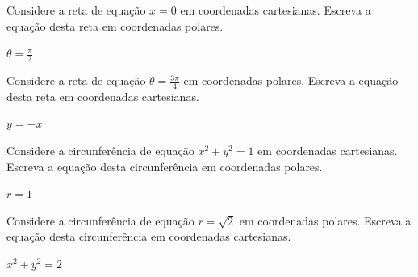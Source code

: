 \begin{exer}
  Considere a reta de equação $x = 0$ em coordenadas cartesianas. Escreva a equação desta reta em coordenadas polares.
\end{exer}
\begin{resp}
  $\theta = \frac{\pi}{2}$
\end{resp}

\begin{exer}
  Considere a reta de equação $\theta = \frac{3\pi}{4}$ em coordenadas polares. Escreva a equação desta reta em coordenadas cartesianas.
\end{exer}
\begin{resp}
  $y = -x$
\end{resp}

\begin{exer}
  Considere a circunferência de equação $x^2 + y^2 = 1$ em coordenadas cartesianas. Escreva a equação desta circunferência em coordenadas polares.
\end{exer}
\begin{resp}
  $r = 1$
\end{resp}

\begin{exer}
  Considere a circunferência de equação $r = \sqrt{2}$ em coordenadas polares. Escreva a equação desta circunferência em coordenadas cartesianas.
\end{exer}
\begin{resp}
  $x^2 + y^2 = 2$
\end{resp}
